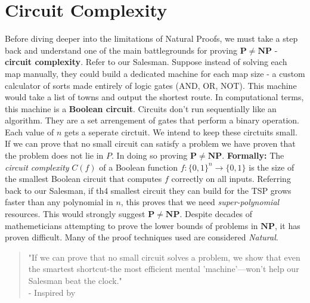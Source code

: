 \documentclass[12pt]{report}
\begin{document}
\section{Circuit Complexity}
Before diving deeper into the limitations of Natural Proofs, we must take a step back and understand one of the main battlegrounds for proving $\mathbf{P \ne NP}$ - \textbf{circuit complexity}.
Refer to our Salesman.
Suppose instead of solving each map manually, they could build a dedicated machine for each map size - a custom calculator of sorts made entirely of logic gates (AND, OR, NOT).
This machine would take a list of towns and output the shortest route.
In computational terms, this machine is a \textbf{Boolean circuit}.
Circuits don't run sequentially like an algorithm.
They are a set arrengement of gates that perform a binary operation.
Each value of $n$ gets a seperate circtuit.
We intend to keep these circtuits small.
If we can prove that no small circuit can satisfy a problem we have proven that the problem does not lie in $P$.
In doing so proving $\mathbf{P \ne NP}$.
\vspace{0.2cm}
\textbf{Formally:}
The \textit{circuit complexity} $C(f)$ of a Boolean function $f : \{0,1\}^n \rightarrow \{0,1\}$ is the size of the smallest Boolean circuit that computes $f$ correctly on all inputs.
\vspace{0.1cm}
Referring back to our Salesman, if th4 smallest circuit they can build for the TSP grows faster than any polynomial in $n$, this proves that we need \textit{super-polynomial} resources.
This would strongly suggest $\mathbf{P \ne NP}$.
\vspace{0.2cm}
Despite decades of mathemeticians attempting to prove the lower bounds of problems in $\mathbf{NP}$, it has proven difficult.
Many of the proof techniques used are considered \textit{Natural}.
\begin{quote}
    "If we can prove that no small circuit solves a problem, we show that even the smartest shortcut-the most efficient mental 'machine'—won't help our Salesman beat the clock."\\
    - Inspired by  \cite{fortnow2009status}
\end{quote}
\end{document}
